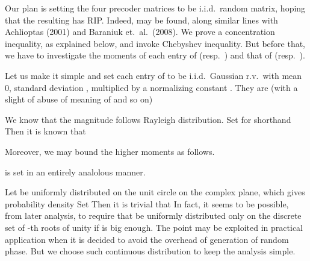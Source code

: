 \startsection [title={Confirming Restricted Isometry of Beamformer}]
\startsubsection [title={Design of Digital Beamformer Entries}]

Our plan is setting the four precoder matrices to be i.i.d.\ random matrix, hoping that the resulting  has RIP.
Indeed,  may be found, along similar lines with Achlioptas (2001) and Baraniuk et.\ al.\ (2008).
We prove a concentration inequality, as explained below, and invoke Chebyshev inequality.
But before that, we have to investigate the moments of each entry of  (resp.\ ) and that of  (resp.\ ).

Let us make it simple and set each entry of  to be i.i.d.\ Gaussian r.v.\ with mean 0, standard deviation , multiplied by a normalizing constant .
They are (with a slight of abuse of meaning of  and so on)

We know that the magnitude  follows Rayleigh distribution.
Set for shorthand
Then it is known that

Moreover, we may bound the higher moments as follows.

 is set in an entirely analolous manner.

\stopsubsection

\startsubsection [title={Design of Analog Beamformer Entries}]

Let  be uniformly distributed on the unit circle on the complex plane, which gives probability density
Set
Then it is trivial that
In fact, it seems to be possible, from later analysis, to require that  be uniformly distributed only on the discrete set of -th roots of unity if  is big enough.
The point may be exploited in practical application when it is decided to avoid the overhead of generation of random phase.
But we choose such continuous distribution to keep the analysis simple.

